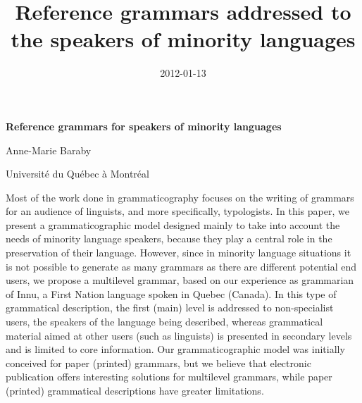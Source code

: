 \documentclass[letterpaper]{article}
\title{Reference grammars addressed to the speakers of minority languages}
\author{}
\date{2012-01-13}
\begin{document}
\clearpage\setcounter{page}{1}\pagestyle{Standard}
{\centering\bfseries
Reference grammars for speakers of minority languages
\par}

{\centering
Anne-Marie Baraby
\par}

{\centering
Universit\'e du Qu\'ebec \`a Montr\'eal
\par}

\clearpage
Most of the work done in grammaticography focuses on the writing of grammars for an audience of linguists, and more specifically, typologists. In this paper, we present a grammati\-cographic model designed mainly to take into account the needs of minority language speakers, because they play a central role in the preservation of their language. However, since in minority language situations it is not possible to generate as many grammars as there are different potential end users, we propose a multilevel grammar, based on our experience as grammarian of Innu, a First Nation language spoken in Quebec (Canada). In this type of grammatical description, the first (main) level is addressed to non-specialist users, the speakers of the language being described, whereas grammatical material aimed at other users (such as linguists) is presented in secondary levels and is limited to core information. Our grammaticographic model was initially conceived for paper (printed) grammars, but we believe that electronic publication offers interesting solutions for multilevel grammars, while  paper (printed) grammatical descriptions have greater limitations.
\end{document}
